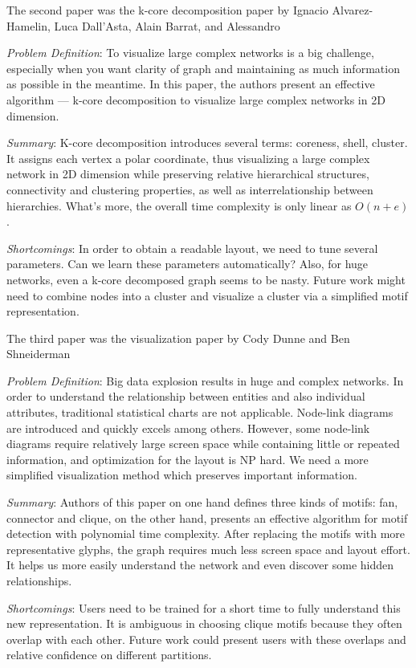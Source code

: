 The second paper was the k-core decomposition paper by Ignacio Alvarez-Hamelin, Luca Dall’Asta, Alain Barrat, and Alessandro
\cite{kcore}
\begin{itemize*}
\item {\em Problem Definition}: To visualize large complex networks is a big challenge, especially when you want clarity of graph and maintaining as much information as possible in the meantime. In this paper, the authors present an effective algorithm — k-core decomposition to visualize large complex networks in 2D dimension.
\item {\em Summary}:
K-core decomposition introduces several terms: coreness, shell, cluster. It assigns each vertex a polar coordinate, thus visualizing a large complex network in 2D dimension while preserving relative hierarchical structures, connectivity and clustering properties, as well as interrelationship between hierarchies. What’s more, the overall time complexity is only linear as $O(n + e)$.
\item{\em Shortcomings}:
In order to obtain a readable layout, we need to tune several parameters. Can we learn these parameters automatically? Also, for huge networks, even a k-core decomposed graph seems to be nasty. Future work might need to combine nodes into a cluster and visualize a cluster via a simplified motif representation.
\end{itemize*}

The third paper was the visualization paper by Cody Dunne and Ben Shneiderman
\cite{motif}
\begin{itemize*}
\item{\em Problem Definition}:
Big data explosion results in huge and complex networks. In order to understand the relationship between entities and also individual attributes, traditional statistical charts are not applicable. Node-link diagrams are introduced and quickly excels among others. However, some node-link diagrams require relatively large screen space while containing little or repeated information, and optimization for the layout is NP hard. We need a more simplified visualization method which preserves important information.
\item{\em Summary}:
Authors of this paper on one hand defines three kinds of motifs: fan, connector and clique, on the other hand, presents an effective algorithm for motif detection with polynomial time complexity. After replacing the motifs with more representative glyphs, the graph requires much less screen space and layout effort. It helps us more easily understand the network and even discover some hidden relationships. 
\item{\em Shortcomings}:
Users need to be trained for a short time to fully understand this new representation. It is ambiguous in choosing clique motifs because they often overlap with each other. Future work could present users with these overlaps and relative confidence on different partitions.
\end{itemize*}
